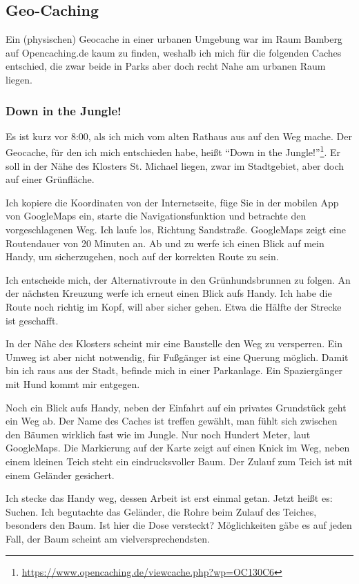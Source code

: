 \subsection{Geo-Caching}

Ein (physischen) Geocache in einer urbanen Umgebung war im Raum Bamberg auf Opencaching.de kaum zu finden, weshalb ich mich für die folgenden Caches entschied, die zwar beide in Parks aber doch recht Nahe am urbanen Raum liegen.

\subsubsection*{Down in the Jungle!}

Es ist kurz vor 8:00, als ich mich vom alten Rathaus aus auf den Weg mache. Der Geocache, für den ich mich entschieden habe, heißt \enquote{Down in the Jungle!}\footnote{\url{https://www.opencaching.de/viewcache.php?wp=OC130C6}}. Er soll in der Nähe des Klosters St. Michael liegen, zwar im Stadtgebiet, aber doch auf einer Grünfläche.

Ich kopiere die Koordinaten von der Internetseite, füge Sie in der mobilen App von GoogleMaps ein, starte die Navigationsfunktion und betrachte den vorgeschlagenen Weg. Ich laufe los, Richtung Sandstraße. GoogleMaps zeigt eine Routendauer von 20 Minuten an. Ab und zu werfe ich einen Blick auf mein Handy, um sicherzugehen, noch auf der korrekten Route zu sein.

Ich entscheide mich, der Alternativroute in den Grünhundsbrunnen zu folgen. An der nächsten Kreuzung werfe ich erneut einen Blick aufs Handy. Ich habe die Route noch richtig im Kopf, will aber sicher gehen. Etwa die Hälfte der Strecke ist geschafft.

In der Nähe des Klosters scheint mir eine Baustelle den Weg zu versperren. Ein Umweg ist aber nicht notwendig, für Fußgänger ist eine Querung möglich. Damit bin ich raus aus der Stadt, befinde mich in einer Parkanlage. Ein Spaziergänger mit Hund kommt mir entgegen.

Noch ein Blick aufs Handy, neben der Einfahrt auf ein privates Grundstück geht ein Weg ab. Der Name des Caches ist treffen gewählt, man fühlt sich zwischen den Bäumen wirklich fast wie im Jungle. Nur noch Hundert Meter, laut GoogleMaps. Die Markierung auf der Karte zeigt auf einen Knick im Weg, neben einem kleinen Teich steht ein eindrucksvoller Baum. Der Zulauf zum Teich ist mit einem Geländer gesichert.

Ich stecke das Handy weg, dessen Arbeit ist erst einmal getan. Jetzt heißt es: Suchen. Ich begutachte das Geländer, die Rohre beim Zulauf des Teiches, besonders den Baum. Ist hier die Dose versteckt? Möglichkeiten gäbe es auf jeden Fall, der Baum scheint am vielversprechendsten.

